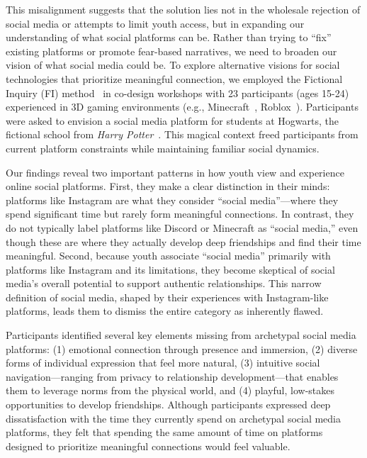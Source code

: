 This misalignment suggests that the solution lies not in the wholesale rejection of social media or attempts to limit youth access, but in expanding our understanding of what social platforms can be. Rather than trying to ``fix'' existing platforms or promote fear-based narratives, we need to broaden our vision of what social media could be. To explore alternative visions for social technologies that prioritize meaningful connection, we employed the Fictional Inquiry (FI) method~\cite{IversenDindler-2007-FictionalInquiry--designSpace-m} in co-design workshops with 23 participants (ages 15-24) experienced in 3D gaming environments (e.g., Minecraft~\cite{minecraft}, Roblox~\cite{roblox}). Participants were asked to envision a social media platform for students at Hogwarts, the fictional school from \textit{Harry Potter}~\cite{rowling2015harry, harrypotterfanclub}. This magical context freed participants from current platform constraints while maintaining familiar social dynamics.

Our findings reveal two important patterns in how youth view and experience online social platforms. First, they make a clear distinction in their minds: platforms like Instagram are what they consider ``social media''---where they spend significant time but rarely form meaningful connections. In contrast, they do not typically label platforms like Discord or Minecraft as ``social media,'' even though these are where they actually develop deep friendships and find their time meaningful. Second, because youth associate ``social media'' primarily with platforms like Instagram and its limitations, they become skeptical of social media's overall potential to support authentic relationships. This narrow definition of social media, shaped by their experiences with Instagram-like platforms, leads them to dismiss the entire category as inherently flawed.

Participants identified several key elements missing from archetypal social media platforms: (1) emotional connection through presence and immersion, (2) diverse forms of individual expression that feel more natural, (3) intuitive social navigation---ranging from privacy to relationship development---that enables them to leverage norms from the physical world, and (4) playful, low-stakes opportunities to develop friendships. Although participants expressed deep dissatisfaction with the time they currently spend on archetypal social media platforms, they felt that spending the same amount of time on platforms designed to prioritize meaningful connections would feel valuable.

